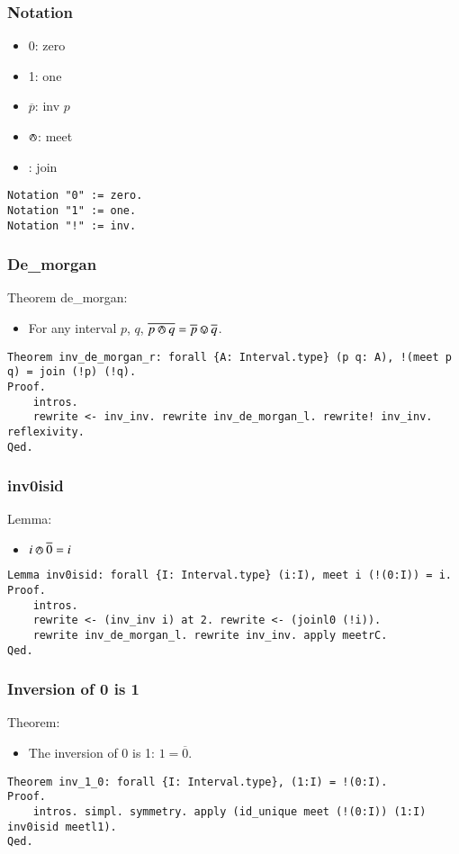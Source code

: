 \documentclass[a4paper,10pt]{article} %
\newcommand{\meet}{\circledwedge}
\newcommand{\join}{\circledvee}
\begin{document}
\subsubsection{Notation}
\begin{itemize}
    \item 0: zero
    \item 1: one
    \item \(\overline{p}\): inv \(p\)
    \item \(\meet\): meet
    \item \join: join
\end{itemize}
\begin{lstlisting}
Notation "0" := zero.
Notation "1" := one.
Notation "!" := inv.
\end{lstlisting}

\subsubsection{De\_morgan}
Theorem de\_morgan: 
\begin{itemize}
    \item For any interval \(p\), \(q\), \(\overline{p \meet q} = \overline{p} \join \overline{q}\).
\end{itemize}
\begin{lstlisting}
Theorem inv_de_morgan_r: forall {A: Interval.type} (p q: A), !(meet p q) = join (!p) (!q).
Proof.
    intros.
    rewrite <- inv_inv. rewrite inv_de_morgan_l. rewrite! inv_inv. reflexivity.
Qed.    
\end{lstlisting}

\subsubsection{inv0isid}
Lemma:
\begin{itemize}
    \item $i \meet \overline{0} = i$
\end{itemize}
\begin{lstlisting}
Lemma inv0isid: forall {I: Interval.type} (i:I), meet i (!(0:I)) = i.
Proof.
    intros.
    rewrite <- (inv_inv i) at 2. rewrite <- (joinl0 (!i)). 
    rewrite inv_de_morgan_l. rewrite inv_inv. apply meetrC.
Qed.
\end{lstlisting}

\subsubsection{Inversion of 0 is 1}
Theorem: 
\begin{itemize}
    \item The inversion of 0 is 1: \(1 = \overline{0}\).
\end{itemize}
\begin{lstlisting}
Theorem inv_1_0: forall {I: Interval.type}, (1:I) = !(0:I).
Proof.
    intros. simpl. symmetry. apply (id_unique meet (!(0:I)) (1:I) inv0isid meetl1).
Qed.
\end{lstlisting}
\end{document}
